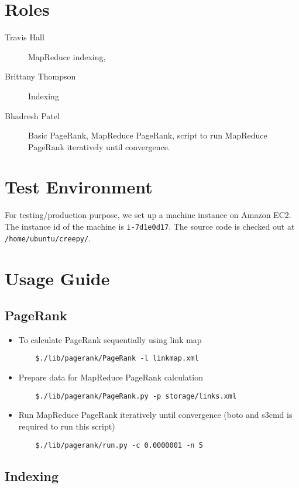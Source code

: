 \documentclass[letterpaper,11pt,twoside]{article}
\begin{document}
\section{Roles}
\begin{description}
 \item[Travis Hall] MapReduce indexing,
 \item[Brittany Thompson] Indexing
 \item[Bhadresh Patel] Basic PageRank, MapReduce PageRank, script to run MapReduce PageRank iteratively until convergence.
\end{description}

\section{Test Environment}
For testing/production purpose, we set up a machine instance on Amazon EC2. The instance id of the machine is \texttt{i-7d1e0d17}. The source code is checked out at \texttt{/home/ubuntu/creepy/}.

\section{Usage Guide}

\subsection{PageRank}
\begin{itemize}
	\item To calculate PageRank sequentially using link map
\begin{verbatim}
	$./lib/pagerank/PageRank -l linkmap.xml
\end{verbatim}

	\item Prepare data for MapReduce PageRank calculation
\begin{verbatim}
	$./lib/pagerank/PageRank.py -p storage/links.xml
\end{verbatim}
	
	\item Run MapReduce PageRank iteratively until convergence (boto and s3cmd is required to run this script)
\begin{verbatim}
	$./lib/pagerank/run.py -c 0.0000001 -n 5
\end{verbatim}
\end{itemize}
\subsection{Indexing}
\end{document}
